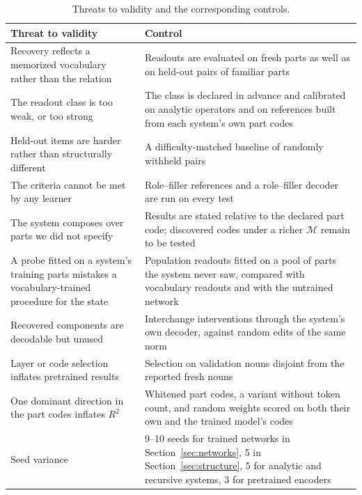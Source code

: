 \documentclass[10pt]{article}
\theoremstyle{plain}
\theoremstyle{remark}
\newcommand{\M}{\mathcal{M}}
\begin{document}
\begin{table}[h]
  \caption{Threats to validity and the corresponding controls.}
  \label{tab:controls}
  \centering\small
  \begin{tabularx}{\linewidth}{@{}YY@{}}
    \toprule
    Threat to validity & Control \\
    \midrule
    Recovery reflects a memorized vocabulary rather than the relation & Readouts are evaluated on fresh parts as well as on held-out pairs of familiar parts \\
    The readout class is too weak, or too strong & The class is declared in advance and calibrated on analytic operators and on references built from each system's own part codes \\
    Held-out items are harder rather than structurally different & A difficulty-matched baseline of randomly withheld pairs \\
    The criteria cannot be met by any learner & Role--filler references and a role--filler decoder are run on every test \\
    The system composes over parts we did not specify & Results are stated relative to the declared part code; discovered codes under a richer $\M$ remain to be tested \\
    A probe fitted on a system's training parts mistakes a vocabulary-trained procedure for the state & Population readouts fitted on a pool of parts the system never saw, compared with vocabulary readouts and with the untrained network \\
    Recovered components are decodable but unused & Interchange interventions through the system's own decoder, against random edits of the same norm \\
    Layer or code selection inflates pretrained results & Selection on validation nouns disjoint from the reported fresh nouns \\
    One dominant direction in the part codes inflates $R^2$ & Whitened part codes, a variant without token count, and random weights scored on both their own and the trained model's codes \\
    Seed variance & 9--10 seeds for trained networks in Section~\ref{sec:networks}, 5 in Section~\ref{sec:structure}, 5 for analytic and recursive systems, 3 for pretrained encoders \\
    \bottomrule
  \end{tabularx}
\end{table}
\end{document}
